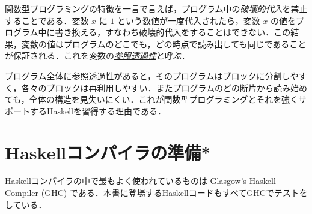 \documentclass[a4paper]{jsbook}
\newcommand{\programminglanguage}[1]{\textsf{#1}}
\newcommand{\haskell}{\programminglanguage{Haskell}}
\newcommand{\keyword}[1]{{\underline{\emph{#1}}}}
\begin{document}
関数型プログラミングの特徴を一言で言えば，プログラム中の\keyword{破壊的代入}を禁止することである．変数 $x$ に $1$ という数値が一度代入されたら，変数 $x$ の値をプログラム中に書き換える，すなわち破壊的代入をすることはできない．この結果，変数の値はプログラムのどこでも，どの時点で読み出しても同じであることが保証される．これを変数の\keyword{参照透過性}と呼ぶ．

プログラム全体に参照透過性があると，そのプログラムはブロックに分割しやすく，各々のブロックは再利用しやすい．またプログラムのどの断片から読み始めても，全体の構造を見失いにくい．これが関数型プログラミングとそれを強くサポートする\haskell を習得する理由である．







\section{\haskell コンパイラの準備*}

\haskell コンパイラの中で最もよく使われているものは Glasgow's Haskell Compiler (GHC) である．本書に登場する\haskell コードもすべてGHCでテストをしている．
\end{document}
